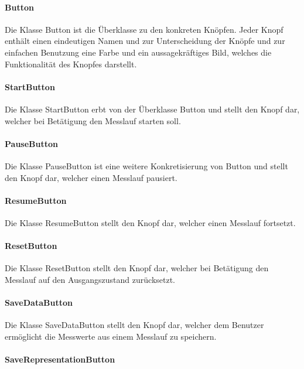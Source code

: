 \documentclass[parskip=full]{scrartcl}
\begin{document}
\paragraph{Button}

Die Klasse Button ist die Überklasse zu den konkreten Knöpfen. Jeder Knopf enthält einen eindeutigen Namen und zur Unterscheidung der Knöpfe und zur einfachen Benutzung eine Farbe und ein aussagekräftiges Bild, welches die Funktionalität des Knopfes darstellt.

\paragraph{StartButton}

Die Klasse StartButton erbt von der Überklasse Button und stellt den Knopf dar, welcher bei Betätigung den Messlauf starten soll.

\paragraph{PauseButton}

Die Klasse PauseButton ist eine weitere Konkretisierung von Button und stellt den Knopf dar, welcher einen Messlauf pausiert.

\paragraph{ResumeButton}

Die Klasse ResumeButton stellt den Knopf dar, welcher einen Messlauf fortsetzt.

\paragraph{ResetButton}

Die Klasse ResetButton stellt den Knopf dar, welcher bei Betätigung den Messlauf auf den Ausgangszustand zurücksetzt.

\paragraph{SaveDataButton}

Die Klasse SaveDataButton stellt den Knopf dar, welcher dem Benutzer ermöglicht die Messwerte aus einem Messlauf zu speichern.

\paragraph{SaveRepresentationButton}
\end{document}
